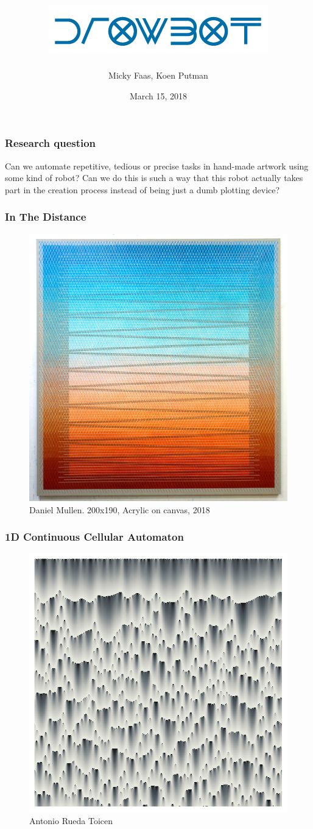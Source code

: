 \documentclass[12pt]{beamer}
\title[ Drowbot] %
{\includegraphics{images/logo-01.png} }
\author[Micky Faas, Koen Putman]{Micky Faas, Koen Putman}
\institute[] %
{ Leiden University - LIACS }
\date{March 15, 2018}
\begin{document}
\frame{\titlepage}
\begin{frame}[c]\frametitle{Research question}
\large
Can we automate repetitive, tedious or precise tasks in hand-made artwork using some kind of robot?
Can we do this is such a way that this robot actually takes part in the creation process instead of being just a dumb plotting device?
\end{frame}

\begin{frame}[c]\frametitle{In The Distance}
\begin{figure}
  \centering
  \includegraphics[width=.6\textwidth]{images/inthedistance.jpg}
  \caption{Daniel Mullen. 200x190, Acrylic on canvas, 2018}
\end{figure}
\end{frame}

\begin{frame}[c]\frametitle{1D Continuous Cellular Automaton}
\begin{figure}
  \centering
  \includegraphics[width=.6\textwidth]{images/1d_cont_ca.png}
  \caption{Antonio Rueda Toicen}
\end{figure}
\end{frame}
\end{document}
